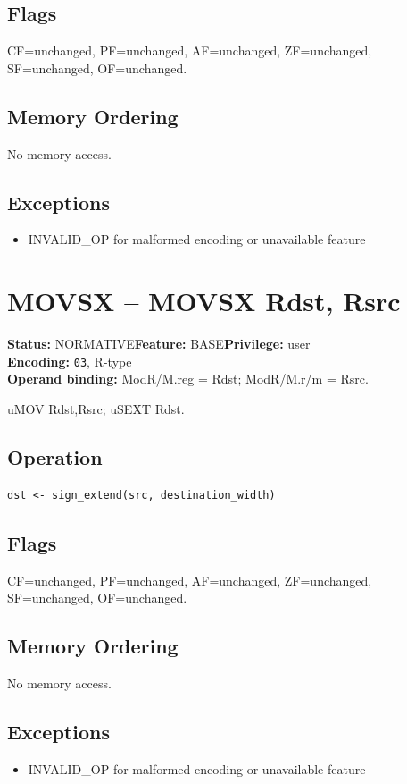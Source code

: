 \documentclass[10pt]{article}
\begin{document}
\subsection*{Flags}
CF=unchanged, PF=unchanged, AF=unchanged, ZF=unchanged, SF=unchanged, OF=unchanged.
\subsection*{Memory Ordering}
No memory access.
\subsection*{Exceptions}
\begin{itemize}
\item INVALID\_OP for malformed encoding or unavailable feature
\end{itemize}
\clearpage

\section{MOVSX -- MOVSX Rdst, Rsrc}
\textbf{Status:} NORMATIVE\quad \textbf{Feature:} BASE\quad \textbf{Privilege:} user\\
\textbf{Encoding:} \texttt{03}, R-type\\
\textbf{Operand binding:} ModR/M.reg = Rdst; ModR/M.r/m = Rsrc.

uMOV Rdst,Rsrc; uSEXT Rdst.

\subsection*{Operation}
\begin{lstlisting}
dst <- sign_extend(src, destination_width)
\end{lstlisting}
\subsection*{Flags}
CF=unchanged, PF=unchanged, AF=unchanged, ZF=unchanged, SF=unchanged, OF=unchanged.
\subsection*{Memory Ordering}
No memory access.
\subsection*{Exceptions}
\begin{itemize}
\item INVALID\_OP for malformed encoding or unavailable feature
\end{itemize}
\clearpage
\end{document}
